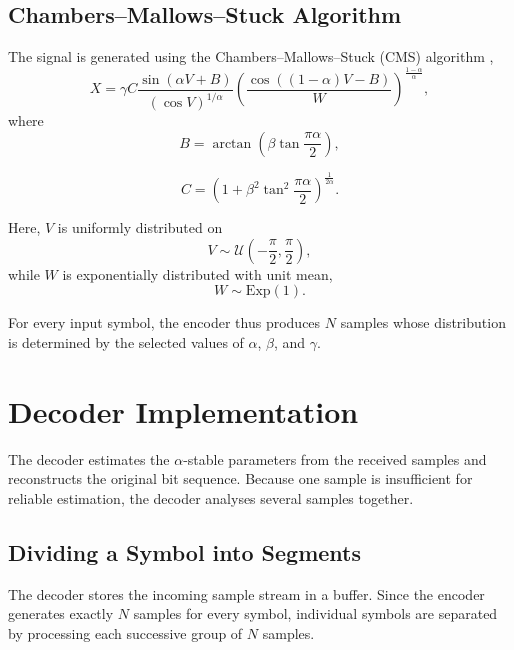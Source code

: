 \documentclass[a4paper, 12pt, openany]{book}
\begin{document}
\subsection{Chambers--Mallows--Stuck Algorithm}
\begin{tcolorbox}[breakable,colback=blue!5!white,colframe=blue!50!black,
title=Procedure 1: Sample generation using the CMS algorithm]
\label{met:cms_generator}
The signal is generated using the Chambers--Mallows--Stuck (CMS) algorithm \cite{ahmed2017random}\cite{weron1996chambers},
\begin{equation}
X=\gamma C
\frac{\sin\left(\alpha V+B\right)}
{\left(\cos V\right)^{1/\alpha}}
\left(
\frac{\cos\left((1-\alpha)V-B\right)}
{W}
\right)^{\frac{1-\alpha}{\alpha}},
\end{equation}
where
\begin{equation}
B=\arctan\left(\beta\tan\frac{\pi\alpha}{2}\right),
\end{equation}

\begin{equation}
C=\left(1+\beta^2\tan^2\frac{\pi\alpha}{2}\right)^{\frac{1}{2\alpha}}.
\end{equation}

Here, $V$ is uniformly distributed on \begin{equation} V\sim\mathcal{U}\left(-\frac{\pi}{2},\frac{\pi}{2}\right), \end{equation} while $W$ is exponentially distributed with unit mean, \begin{equation} W\sim\mathrm{Exp}(1). \end{equation}

For every input symbol, the encoder thus produces $N$ samples whose distribution is determined by the selected values of $\alpha$, $\beta$, and $\gamma$.
\end{tcolorbox}

\section{Decoder Implementation}
The decoder estimates the $\alpha$-stable parameters from the received samples and reconstructs the original bit sequence. Because one sample is insufficient for reliable estimation, the decoder analyses several samples together.

\subsection{Dividing a Symbol into Segments}
The decoder stores the incoming sample stream in a buffer. Since the encoder generates exactly $N$ samples for every symbol, individual symbols are separated by processing each successive group of $N$ samples.
\end{document}
